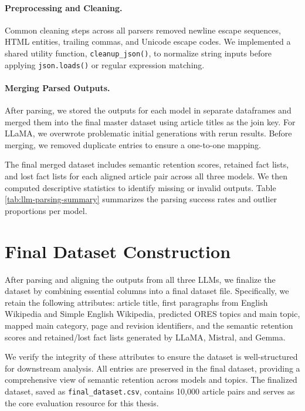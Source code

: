 \documentclass{DESSThesis}
\begin{document}
\paragraph{Preprocessing and Cleaning.}
Common cleaning steps across all parsers removed newline escape sequences, HTML entities, trailing commas, and Unicode escape codes. We implemented a shared utility function, \verb|cleanup_json()|, to normalize string inputs before applying \verb|json.loads()| or regular expression matching.

\paragraph{Merging Parsed Outputs.}
After parsing, we stored the outputs for each model in separate dataframes and merged them into the final master dataset using article titles as the join key. For LLaMA, we overwrote problematic initial generations with rerun results. Before merging, we removed duplicate entries to ensure a one-to-one mapping.

The final merged dataset includes semantic retention scores, retained fact lists, and lost fact lists for each aligned article pair across all three models. We then computed descriptive statistics to identify missing or invalid outputs. Table \ref{tab:llm-parsing-summary} summarizes the parsing success rates and outlier proportions per model. 

\section{Final Dataset Construction}

After parsing and aligning the outputs from all three LLMs, we finalize the dataset by combining essential columns into a final dataset file. Specifically, we retain the following attributes: article title, first paragraphs from English Wikipedia and Simple English Wikipedia, predicted ORES topics and main topic, mapped main category, page and revision identifiers, and the semantic retention scores and retained/lost fact lists generated by LLaMA, Mistral, and Gemma.

We verify the integrity of these attributes to ensure the dataset is well-structured for downstream analysis. All entries are preserved in the final dataset, providing a comprehensive view of semantic retention across models and topics. The finalized dataset, saved as \verb|final_dataset.csv|, contains 10,000 article pairs and serves as the core evaluation resource for this thesis. 
\end{document}
